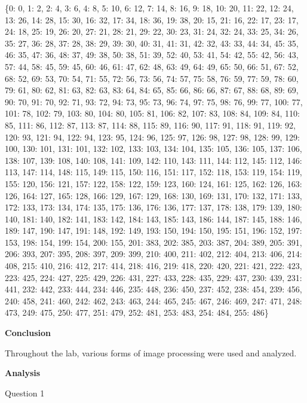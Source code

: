 \documentclass[
]{article}
\begin{document}
\{0: 0, 1: 2, 2: 4, 3: 6, 4: 8, 5: 10, 6: 12, 7: 14, 8: 16, 9: 18, 10:
20, 11: 22, 12: 24, 13: 26, 14: 28, 15: 30, 16: 32, 17: 34, 18: 36, 19:
38, 20: 15, 21: 16, 22: 17, 23: 17, 24: 18, 25: 19, 26: 20, 27: 21, 28:
21, 29: 22, 30: 23, 31: 24, 32: 24, 33: 25, 34: 26, 35: 27, 36: 28, 37:
28, 38: 29, 39: 30, 40: 31, 41: 31, 42: 32, 43: 33, 44: 34, 45: 35, 46:
35, 47: 36, 48: 37, 49: 38, 50: 38, 51: 39, 52: 40, 53: 41, 54: 42, 55:
42, 56: 43, 57: 44, 58: 45, 59: 45, 60: 46, 61: 47, 62: 48, 63: 49, 64:
49, 65: 50, 66: 51, 67: 52, 68: 52, 69: 53, 70: 54, 71: 55, 72: 56, 73:
56, 74: 57, 75: 58, 76: 59, 77: 59, 78: 60, 79: 61, 80: 62, 81: 63, 82:
63, 83: 64, 84: 65, 85: 66, 86: 66, 87: 67, 88: 68, 89: 69, 90: 70, 91:
70, 92: 71, 93: 72, 94: 73, 95: 73, 96: 74, 97: 75, 98: 76, 99: 77, 100:
77, 101: 78, 102: 79, 103: 80, 104: 80, 105: 81, 106: 82, 107: 83, 108:
84, 109: 84, 110: 85, 111: 86, 112: 87, 113: 87, 114: 88, 115: 89, 116:
90, 117: 91, 118: 91, 119: 92, 120: 93, 121: 94, 122: 94, 123: 95, 124:
96, 125: 97, 126: 98, 127: 98, 128: 99, 129: 100, 130: 101, 131: 101,
132: 102, 133: 103, 134: 104, 135: 105, 136: 105, 137: 106, 138: 107,
139: 108, 140: 108, 141: 109, 142: 110, 143: 111, 144: 112, 145: 112,
146: 113, 147: 114, 148: 115, 149: 115, 150: 116, 151: 117, 152: 118,
153: 119, 154: 119, 155: 120, 156: 121, 157: 122, 158: 122, 159: 123,
160: 124, 161: 125, 162: 126, 163: 126, 164: 127, 165: 128, 166: 129,
167: 129, 168: 130, 169: 131, 170: 132, 171: 133, 172: 133, 173: 134,
174: 135, 175: 136, 176: 136, 177: 137, 178: 138, 179: 139, 180: 140,
181: 140, 182: 141, 183: 142, 184: 143, 185: 143, 186: 144, 187: 145,
188: 146, 189: 147, 190: 147, 191: 148, 192: 149, 193: 150, 194: 150,
195: 151, 196: 152, 197: 153, 198: 154, 199: 154, 200: 155, 201: 383,
202: 385, 203: 387, 204: 389, 205: 391, 206: 393, 207: 395, 208: 397,
209: 399, 210: 400, 211: 402, 212: 404, 213: 406, 214: 408, 215: 410,
216: 412, 217: 414, 218: 416, 219: 418, 220: 420, 221: 421, 222: 423,
223: 425, 224: 427, 225: 429, 226: 431, 227: 433, 228: 435, 229: 437,
230: 439, 231: 441, 232: 442, 233: 444, 234: 446, 235: 448, 236: 450,
237: 452, 238: 454, 239: 456, 240: 458, 241: 460, 242: 462, 243: 463,
244: 465, 245: 467, 246: 469, 247: 471, 248: 473, 249: 475, 250: 477,
251: 479, 252: 481, 253: 483, 254: 484, 255: 486\}

\textbf{Conclusion}

Throughout the lab, various forms of image processing were used and
analyzed.

\textbf{Analysis}

Question 1
\end{document}

